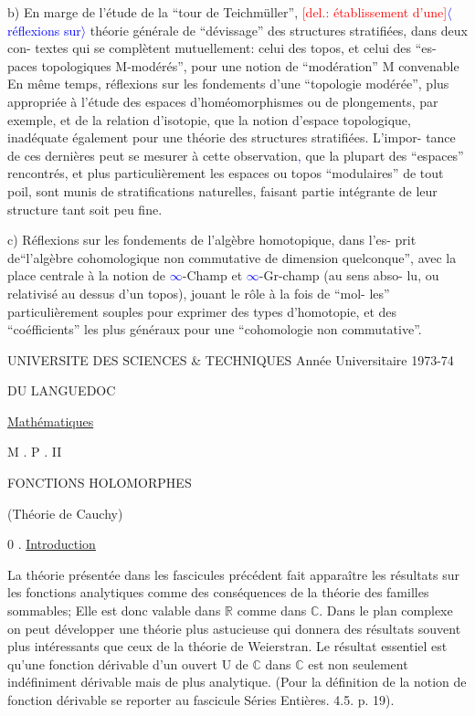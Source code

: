 \documentclass[11pt]{article}
\newcommand{\scanpage}[1]{\par\bigskip\noindent{\small\sffamily[scan #1]}\par}
\newcommand{\mspage}[1]{{\small\sffamily[p.\,#1]}}
\newcommand{\hand}[1]{\textcolor{blue}{#1}}
\newcommand{\inserted}[2][]{\textcolor{blue}{$\langle$#2$\rangle$}}
\newcommand{\deleted}[1]{\textcolor{red}{[\textsf{del.:} #1]}}
\newcommand{\uline}[1]{\underline{#1}}
\begin{document}
b)  En marge de l'étude de la ``tour de Teichmüller'', \deleted{établissement d'une}\inserted{réflexions sur}
théorie générale de ``dévissage'' des structures stratifiées, dans deux con-%
textes qui se complètent mutuellement:  celui des topos,  et celui des ``es-%
paces topologiques M-modérés'',  pour une notion de ``modération'' M convenable
En même temps, réflexions sur les fondements d'une ``topologie modérée'', plus
appropriée à l'étude des espaces d'homéomorphismes ou de plongements,  par
exemple,  et de la relation d'isotopie,  que la notion d'espace topologique,
inadéquate également pour une théorie des structures stratifiées. L'impor-%
tance de ces dernières peut se mesurer à cette observation\hand{,} que la plupart
des ``espaces'' rencontrés,  et plus particulièrement les espaces ou topos
``modulaires'' de tout poil,  sont munis de stratifications naturelles, faisant
partie intégrante de leur structure tant soit peu fine.

c)   Réflexions sur les fondements de l'algèbre homotopique,  dans l'es-%
prit de``l'algèbre cohomologique non commutative de dimension quelconque'',
avec la place centrale à la notion de \hand{$\infty$}-Champ et \hand{$\infty$}-Gr-champ (au sens abso-%
lu,  ou relativisé au dessus d'un topos),  jouant le rôle à la fois de ``mol-%
les'' particulièrement souples pour exprimer des types d'homotopie,  et des
``coéfficients'' les plus généraux pour une ``cohomologie non commutative''.

\mspage{142}

\clearpage
\scanpage{119/162}
UNIVERSITE DES SCIENCES \& TECHNIQUES \hfill Année Universitaire 1973-74

DU LANGUEDOC

\uline{Mathématiques}

M . P . II

FONCTIONS HOLOMORPHES

(Théorie de Cauchy)

0 . \uline{Introduction}

La théorie présentée dans les fascicules précédent fait apparaître
les résultats sur les fonctions analytiques comme des conséquences de la théorie
des familles sommables; Elle est donc valable dans $\mathbb{R}$ comme dans $\mathbb{C}$. Dans le
plan complexe on peut développer une théorie plus astucieuse qui donnera des
résultats souvent plus intéressants que ceux de la théorie de Weierstran. Le
résultat essentiel est qu'une fonction dérivable d'un ouvert U de $\mathbb{C}$ dans $\mathbb{C}$
est non seulement indéfiniment dérivable mais de plus analytique. (Pour la
définition de la notion de fonction dérivable se reporter au fascicule
Séries Entières. 4.5. p. 19).
\end{document}

